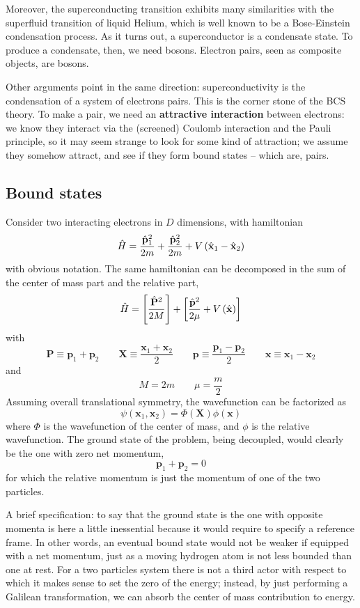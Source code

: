 Moreover, the superconducting transition exhibits many similarities with the superfluid transition of liquid Helium, which is well known to be a Bose-Einstein condensation process. As it turns out, a superconductor is a condensate state. To produce a condensate, then, we need bosons. Electron pairs, seen as composite objects, are bosons.

Other arguments point in the same direction: superconductivity is the condensation of a system of electrons pairs. This is the corner stone of the BCS theory. To make a pair, we need an \textbf{attractive interaction} between electrons: we know they interact via the (screened) Coulomb interaction and the Pauli principle, so it may seem strange to look for some kind of attraction; we assume they somehow attract, and see if they form bound states -- which are, pairs.

\subsection{Bound states}\label{subsec:bound states}

Consider two interacting electrons in $D$ dimensions, with hamiltonian
\[
	\hat H = \frac{\hat{\mathbf{p}}_1^2}{2m} + \frac{\hat{\mathbf{p}}_2^2}{2m} + V\left({\hat{\mathbf{x}}_1-\hat{\mathbf{x}}_2}\right)
\]
with obvious notation. The same hamiltonian can be decomposed in the sum of the center of mass part and the relative part,
\[
	\hat H = \left[{\frac{\hat{\mathbf{P}}^2}{2M}}\right] + \left[{\frac{\hat{\mathbf{p}}^2}{2\mu} + V \left({\hat{\mathbf{x}}}\right)}\right]
\]
with
\[
	\mathbf{P} \equiv \mathbf{p}_1 + \mathbf{p}_2
	\qquad
	\mathbf{X} \equiv \frac{\mathbf{x}_1 + \mathbf{x}_2}{2}
	\qquad
	\mathbf{p} \equiv \frac{\mathbf{p}_1 - \mathbf{p}_2}{2}
	\qquad
	\mathbf{x} \equiv \mathbf{x}_1 - \mathbf{x}_2
\]
and
\[
	M = 2m
	\qquad
	\mu = \frac{m}{2}
\]
Assuming overall translational symmetry, the wavefunction can be factorized as
\[
	\psi(\mathbf{x}_1,\mathbf{x}_2) = \Phi(\mathbf{X}) \phi(\mathbf{x})
\]
where $\Phi$ is the wavefunction of the center of mass, and $\phi$ is the relative wavefunction. The ground state of the problem, being decoupled, would clearly be the one with zero net momentum,
\[
	\mathbf{p}_1 + \mathbf{p}_2 = 0
\]
for which the relative momentum is just the momentum of one of the two particles.

A brief specification: to say that the ground state is the one with opposite momenta is here a little inessential because it would require to specify a reference frame. In other words, an eventual bound state would not be weaker if equipped with a net momentum, just as a moving hydrogen atom is not less bounded than one at rest. For a two particles system there is not a third actor with respect to which it makes sense to set the zero of the energy; instead, by just performing a Galilean transformation, we can absorb the center of mass contribution to energy.

